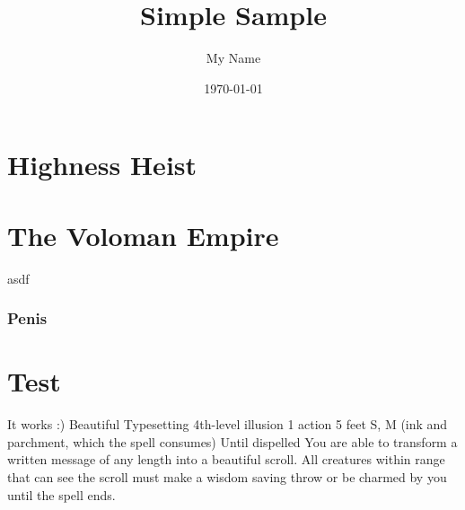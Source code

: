 \documentclass{memoir}
\title{Simple Sample} %
\author{My Name} %
\date{\today} %
\begin{document}
\tableofcontents

\chapter{Highness Heist}

\lipsum

\chapter{The Voloman Empire}

asdf

\subsection{Penis}
\lipsum

\chapter{Test}
It works :)
\RPGSpellHeader
	{Beautiful Typesetting}
	{4th-level illusion}
	{1 action}
	{5 feet}
	{S, M (ink and parchment, which the spell consumes)}
	{Until dispelled}
You are able to transform a written message of any length into a beautiful scroll. All creatures within range that can see the scroll must make a wisdom saving throw or be charmed by you until the spell ends.
\end{document}

